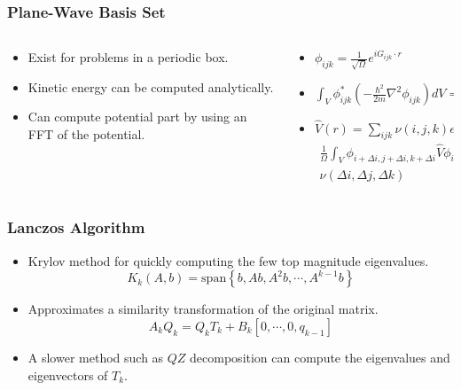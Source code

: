 \documentclass[]{beamer}
\begin{document}
 
\begin{frame}

 \frametitle{Plane-Wave Basis Set}
 
 \begin{columns}
   \begin{column}{0.4\textwidth}
     \begin{itemize}
         \item<1-> Exist for problems in a periodic box. 
         \item<2-> Kinetic energy can be computed analytically.
         \item<3-> Can compute potential part by using an FFT of the potential. 
     \end{itemize}
   \end{column}
 
   \begin{column}{0.6\textwidth}
      \begin{itemize}
         \item<1-> $\phi_{ijk}= \frac{1}{\sqrt{\Omega}} e^{iG_{ijk}\cdot r}$
         \item<2-> $\int_{V} \phi_{ijk}^* \left( -\frac{\hbar^2}{2m}\nabla ^2 \phi_{ijk}\right) dV = \frac{\hbar^2}{2m} |G_{ijk}|^2$
         \item<3-> $\hat{V}(r) = \sum_{ijk} \nu (i,j,k) e ^ {i G_{ijk} \cdot r}$
          \begin{eqnarray*}
          \frac{1}{\Omega} \int_V  \phi_{i+\Delta i,j+\Delta i,k+\Delta i} \hat{V}  \phi_{i,j,k} dV = \\ \nu(\Delta i,\Delta j, \Delta k)
          \end{eqnarray*}
      \end{itemize}
   \end{column}
 \end{columns}
 
  
\end{frame}




\begin{frame}
  \frametitle{Lanczos Algorithm}   

  \begin{itemize}
  \item<1-> Krylov method for quickly computing the few top magnitude eigenvalues.
  \begin{equation*}
  K_k (A,b) = \mathrm{span} \left\lbrace b,Ab,A^2 b,\cdots , A^{k-1}b \right\rbrace
  \end{equation*}
  \item<3-> Approximates a similarity transformation of the original matrix.
  \begin{equation*}
  A_k Q_k = Q_k T_k + B_k [0,\cdots , 0, q_{k-1}]
  \end{equation*}
  \item<4-> A slower method such as $QZ$ decomposition can compute the eigenvalues and eigenvectors of $T_k$.
  \end{itemize}
  
\end{frame}
\end{document}
